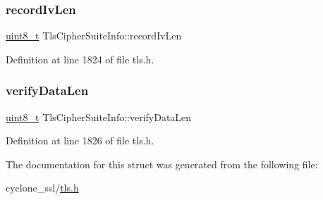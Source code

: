 \subsubsection{\texorpdfstring{record\+Iv\+Len}{recordIvLen}}
{\footnotesize\ttfamily \hyperlink{stdint_8h_aba7bc1797add20fe3efdf37ced1182c5}{uint8\+\_\+t} Tls\+Cipher\+Suite\+Info\+::record\+Iv\+Len}



Definition at line 1824 of file tls.\+h.

\mbox{\label{structTlsCipherSuiteInfo_a550f3617b1c48632d9613338edd22e7f}} 
\subsubsection{\texorpdfstring{verify\+Data\+Len}{verifyDataLen}}
{\footnotesize\ttfamily \hyperlink{stdint_8h_aba7bc1797add20fe3efdf37ced1182c5}{uint8\+\_\+t} Tls\+Cipher\+Suite\+Info\+::verify\+Data\+Len}



Definition at line 1826 of file tls.\+h.



The documentation for this struct was generated from the following file\+:\begin{DoxyCompactItemize}
\item 
cyclone\+\_\+ssl/\hyperlink{tls_8h}{tls.\+h}\end{DoxyCompactItemize}
